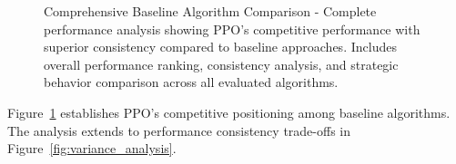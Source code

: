 \documentclass[12pt,oneside]{article}
\begin{document}
\begin{figure}[H]
\caption{Comprehensive Baseline Algorithm Comparison - Complete performance analysis showing PPO's competitive performance with superior consistency compared to baseline approaches. Includes overall performance ranking, consistency analysis, and strategic behavior comparison across all evaluated algorithms.}
\label{fig:comprehensive_baseline_comparison}
\end{figure}

Figure~\ref{fig:comprehensive_baseline_comparison} establishes PPO's competitive positioning among baseline algorithms. The analysis extends to performance consistency trade-offs in Figure~\ref{fig:variance_analysis}.
\end{document}
